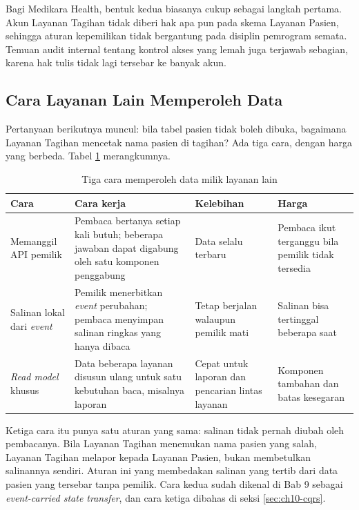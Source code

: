 Bagi Medikara Health, bentuk kedua biasanya cukup sebagai langkah pertama. Akun Layanan Tagihan
tidak diberi hak apa pun pada skema Layanan Pasien, sehingga aturan kepemilikan tidak bergantung
pada disiplin pemrogram semata. Temuan audit internal tentang kontrol akses yang lemah juga
terjawab sebagian, karena hak tulis tidak lagi tersebar ke banyak akun.

\subsection{Cara Layanan Lain Memperoleh Data}

Pertanyaan berikutnya muncul: bila tabel pasien tidak boleh dibuka, bagaimana Layanan Tagihan
mencetak nama pasien di tagihan? Ada tiga cara, dengan harga yang berbeda. Tabel
\ref{tab:ch10-cara-membaca} merangkumnya.

\begin{table}[!htb]
  \centering
  \caption{Tiga cara memperoleh data milik layanan lain}
  \label{tab:ch10-cara-membaca}
  \footnotesize
  \begin{tabularx}{\textwidth}{>{\raggedright\arraybackslash}p{2.5cm} >{\raggedright\arraybackslash}X >{\raggedright\arraybackslash}X >{\raggedright\arraybackslash}X}
    \hline
    \textbf{Cara} & \textbf{Cara kerja} & \textbf{Kelebihan} & \textbf{Harga} \\ \hline
    Memanggil API pemilik & Pembaca bertanya setiap kali butuh; beberapa jawaban dapat
      digabung oleh satu komponen penggabung & Data selalu terbaru & Pembaca ikut terganggu bila
      pemilik tidak tersedia \\ \hline
    Salinan lokal dari \textit{event} & Pemilik menerbitkan \textit{event} perubahan; pembaca
      menyimpan salinan ringkas yang hanya dibaca & Tetap berjalan walaupun pemilik mati &
      Salinan bisa tertinggal beberapa saat \\ \hline
    \textit{Read model} khusus & Data beberapa layanan disusun ulang untuk satu kebutuhan baca,
      misalnya laporan & Cepat untuk laporan dan pencarian lintas layanan & Komponen tambahan dan
      batas kesegaran \\ \hline
  \end{tabularx}
\end{table}

Ketiga cara itu punya satu aturan yang sama: salinan tidak pernah diubah oleh pembacanya. Bila
Layanan Tagihan menemukan nama pasien yang salah, Layanan Tagihan melapor kepada Layanan Pasien,
bukan membetulkan salinannya sendiri. Aturan ini yang membedakan salinan yang tertib dari data
pasien yang tersebar tanpa pemilik. Cara kedua sudah dikenal di Bab 9 sebagai
\textit{event-carried state transfer}, dan cara ketiga dibahas di seksi \ref{sec:ch10-cqrs}.

